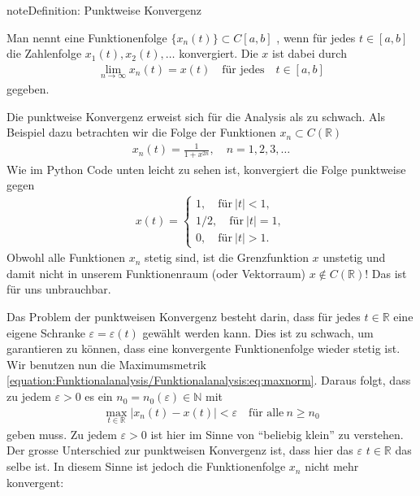 \documentclass[letterpaper,10pt,english]{jupyterBook}
\begin{document}
\begin{sphinxadmonition}{note}{Definition: Punktweise Konvergenz}

Man nennt eine Funktionenfolge \(\{x_n(t)\} \subset C[a,b]\) , wenn für jedes \(t\in [a,b]\) die Zahlenfolge \(x_1(t), x_2(t), \ldots \) konvergiert. Die  \(x\) ist dabei durch
\begin{equation*}
\begin{split}\lim_{n\to\infty} x_n(t) = x(t)\quad\text{für jedes}\quad t\in [a,b]\end{split}
\end{equation*}
gegeben.
\end{sphinxadmonition}

Die punktweise Konvergenz erweist sich für die Analysis als zu schwach. Als Beispiel dazu betrachten wir die Folge der Funktionen \(x_n \subset C(\mathbb{R})\)
\begin{equation*}
\begin{split}x_n(t) = \frac{1}{1+x^{2n}},\quad n=1,2,3,\ldots\end{split}
\end{equation*}
Wie im Python Code unten leicht zu sehen ist, konvergiert die Folge punktweise gegen
\begin{equation*}
\begin{split}x(t) = \begin{cases}
1,\quad \text{für}\ |t| < 1,\\
1/2, \quad \text{für}\ |t| = 1,\\
0, \quad \text{für}\ |t| > 1.\end{cases}\end{split}
\end{equation*}
Obwohl alle Funktionen \(x_n\) stetig sind, ist die Grenzfunktion \(x\) unstetig und damit nicht in unserem Funktionenraum (oder Vektorraum) \(x\not\in C(\mathbb{R})\)! Das ist für uns unbrauchbar.

\noindent{}

Das Problem der punktweisen Konvergenz besteht darin, dass für jedes \(t\in\mathbb{R}\) eine eigene Schranke \(\varepsilon = \varepsilon(t)\) gewählt werden kann. Dies ist zu schwach, um garantieren zu können, dass eine konvergente Funktionenfolge wieder stetig ist. Wir benutzen nun die Maximumsmetrik \eqref{equation:Funktionalanalysis/Funktionalanalysis:eq:maxnorm}. Daraus folgt, dass zu jedem \(\varepsilon > 0\) es ein \(n_0 = n_0(\varepsilon) \in \mathbb{N}\) mit
\begin{equation*}
\begin{split}\max_{t\in\mathbb{R}} |x_n(t) - x(t)| < \varepsilon\quad \text{für alle}\ n \ge n_0\end{split}
\end{equation*}
geben muss. Zu jedem \(\varepsilon > 0\) ist hier im Sinne von “beliebig klein” zu verstehen. Der grosse Unterschied zur punktweisen Konvergenz ist, dass hier das \(\varepsilon\)  \(t\in\mathbb{R}\) das selbe ist. In diesem Sinne ist jedoch die Funktionenfolge \(x_n\) nicht mehr konvergent:
\end{document}
